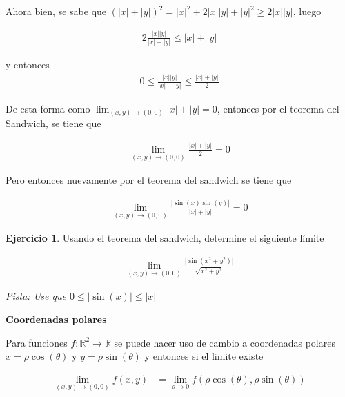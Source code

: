 \documentclass{article}
\theoremstyle{plain}
\theoremstyle{definition}
\newtheorem{ejer}[thm]{Ejercicio}
\begin{document}
Ahora bien, se sabe que $(|x|+|y|)^2 = |x|^2+2|x||y|+|y|^2 \geq 2|x||y|$, luego

\begin{align*}
    2\frac{|x||y|}{|x|+|y|} \leq |x|+|y|
\end{align*}

y entonces
\begin{align*}
    0 \leq \frac{|x||y|}{|x|+|y|} \leq \frac{|x|+|y|}{2}
\end{align*}

De esta forma  como $\displaystyle \lim_{(x,y) \to (0,0)} |x|+|y| = 0$, entonces por el teorema del Sandwich, se tiene que

\begin{align*}
    \lim_{(x,y) \to (0,0)} \frac{|x|+|y|}{2} = 0
\end{align*}

Pero entonces nuevamente por el teorema del sandwich se tiene que


\begin{align*}
    \lim_{(x,y) \to (0,0)} \frac{|\sin(x)\sin(y)|}{|x|+|y|} = 0
\end{align*}

\begin{ejer}Usando el teorema del sandwich, determine el siguiente l\'imite
\end{ejer}

\begin{align*}
    \lim_{(x,y) \to (0,0)} \frac{|\sin(x^2+y^2)|}{\sqrt{x^2+y^2}}
\end{align*}

\textit{Pista: Use que $0 \leq |\sin(x)| \leq |x|$}



\newpage



\begin{center}
\textbf{\large{Coordenadas polares}} \\
\end{center}



Para funciones $f: \mathbb{R}^2 \to \mathbb{R}$ se puede hacer uso de cambio a coordenadas polares $x = \rho \cos(\theta)$ y $y = \rho \sin(\theta)$ y entonces si el limite existe



\begin{align*}
\displaystyle \lim_{(x,y) \to (0,0)}   f(x,y)   &=  \lim_{\rho \to 0} f(\rho \cos(\theta), \rho \sin(\theta))
\end{align*}
\end{document}
